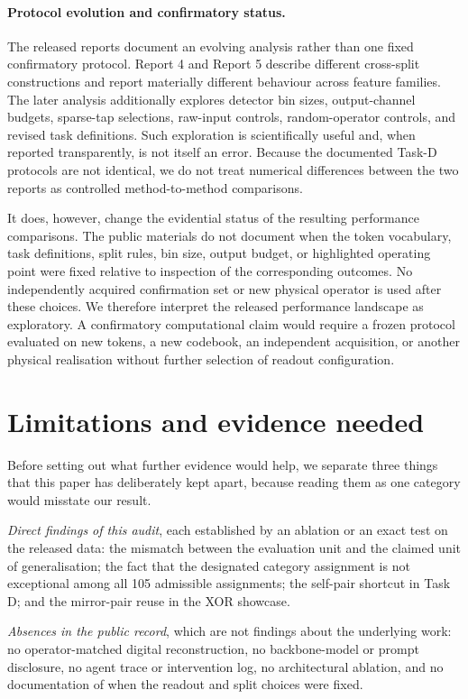\documentclass[11pt,a4paper]{article}
\begin{document}
\paragraph{Protocol evolution and confirmatory status.}
The released reports document an evolving analysis rather than one fixed
confirmatory protocol. Report 4 and Report 5 describe different
cross-split constructions and report materially different behaviour across
feature families. The later analysis additionally explores detector bin
sizes, output-channel budgets, sparse-tap selections, raw-input controls,
random-operator controls, and revised task definitions. Such exploration is
scientifically useful and, when reported transparently, is not itself an
error. Because the documented Task-D protocols are not identical, we do not
treat numerical differences between the two reports as controlled
method-to-method comparisons.

It does, however, change the evidential status of the resulting performance
comparisons. The public materials do not document when the token vocabulary,
task definitions, split rules, bin size, output budget, or highlighted
operating point were fixed relative to inspection of the corresponding
outcomes. No independently acquired confirmation set or new physical
operator is used after these choices. We therefore interpret the released
performance landscape as exploratory. A confirmatory computational claim
would require a frozen protocol evaluated on new tokens, a new codebook, an
independent acquisition, or another physical realisation without further
selection of readout configuration.

\section{Limitations and evidence needed}
\label{sec:settle}

Before setting out what further evidence would help, we separate three things
that this paper has deliberately kept apart, because reading them as one
category would misstate our result.

\emph{Direct findings of this audit}, each established by an ablation or an
exact test on the released data: the mismatch between the evaluation unit and
the claimed unit of generalisation; the fact that the designated category
assignment is not exceptional among all 105 admissible assignments; the
self-pair shortcut in Task D; and the mirror-pair reuse in the XOR showcase.

\emph{Absences in the public record}, which are not findings about the
underlying work: no operator-matched digital reconstruction, no
backbone-model or prompt disclosure, no agent trace or intervention log, no
architectural ablation, and no documentation of when the readout and split
choices were fixed.
\end{document}
